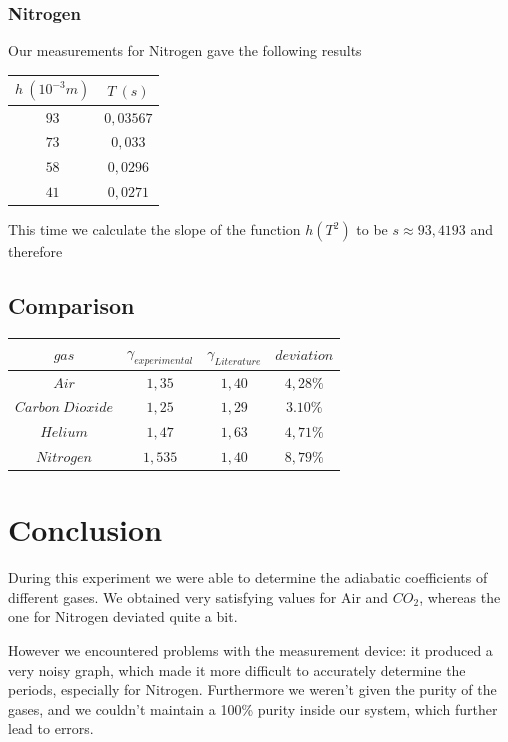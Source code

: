 \documentclass{scrartcl}
\begin{document}
\subsubsection{Nitrogen}
Our measurements for Nitrogen gave the following results

\medskip

\centering
\begin{tabular}{|c|c|}
    \hline
     $h  \ (10^{-3}m) $& $T  \ (s)$  \\
     \hline
     $93$ & $0,03567$ \\
     \hline
     $73$ & $0,033$ \\
     \hline
     $58$ & $0,0296$ \\
     \hline
     $41$ & $0,0271$ \\
     \hline
\end{tabular}
\flushleft
This time we calculate the slope of the function $h(T^2)$ to be $s\approx93,4193$ and therefore 

\subsection{Comparison}

\centering
\begin{tabular}{|c|c|c|c|}
    \hline
    $gas$ & $\gamma_{experimental}$ & $\gamma_{Literature}$ & $deviation$ \\
    \hline
    $Air$ & $1,35$ & $1,40$ & $4,28\%$ \\
    \hline
    $Carbon \ Dioxide$ & $1,25$ & $1,29$ & $3.10\%$ \\
    \hline
    $Helium$ & $1,47$ & $1,63$ & $4,71\%$ \\
    \hline
    $Nitrogen$ & $1,535$ & $1,40$ & $8,79\%$ \\
    \hline
\end{tabular}
\flushleft

\section{Conclusion}
During this experiment we were able to determine the adiabatic coefficients of different gases. We obtained very satisfying values for Air and $CO_2$, whereas the one for Nitrogen deviated quite a bit. 

However we encountered problems with the measurement device: it produced a very noisy graph, which made it more difficult to accurately determine the periods, especially for Nitrogen. Furthermore we weren't given the purity of the gases, and we couldn't maintain a 100\% purity inside our system, which further lead to errors.
\end{document}
